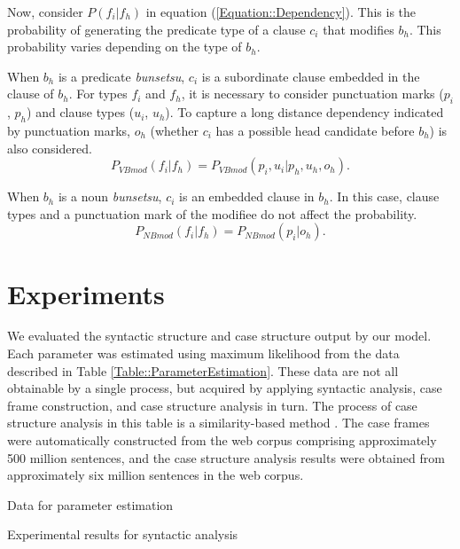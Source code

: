 \documentclass[english]{jnlp_1.4_rep}
\begin{document}
Now, consider $P(f_i|f_h)$ in equation
(\ref{Equation::Dependency}). This is the probability of generating
the predicate type of a clause $c_i$ that modifies $b_h$. This
probability varies depending on the type of $b_h$.

When $b_h$ is a predicate \textit{bunsetsu}, $c_i$ is a subordinate
clause embedded in the clause of $b_h$. For types $f_i$
and $f_h$, it is necessary to consider punctuation marks ($p_i$,
$p_h$) and clause types ($u_i$, $u_h$). To capture a long
distance dependency indicated by punctuation marks, $o_h$ (whether
$c_i$ has a possible head candidate before $b_h$) is also
considered.
\begin{equation}
 P_{VBmod}(f_i|f_h) = P_{VBmod}(p_i,u_i|p_h,u_h,o_h).
\end{equation}

When $b_h$ is a noun \textit{bunsetsu}, $c_i$ is an embedded clause
in $b_h$. In this case, clause types and a punctuation mark of the
modifiee do not affect the probability.
\begin{equation}
 P_{NBmod}(f_i|f_h) = P_{NBmod}(p_i|o_h).
\end{equation}


\section{Experiments}

We evaluated the syntactic structure and case structure output by our
model. Each parameter was estimated using maximum likelihood from the
data described in Table \ref{Table::ParameterEstimation}. These
data are not all obtainable by a single process, but acquired by
applying syntactic analysis, case frame construction, and case structure
analysis in turn. The process of case structure analysis in this table
is a similarity-based method \cite{Kawahara2002e}. The case frames were
automatically constructed from the web corpus comprising approximately
500 million sentences, and the case structure analysis results were obtained
from approximately six million sentences in the web corpus.

\begin{table}[b]
 \caption{Data for parameter estimation}
 \label{Table::ParameterEstimation}

\end{table}

\begin{table}[b]
 \caption{Experimental results for syntactic analysis}
 \label{Table::Accuracy}

\end{table}
\end{document}
